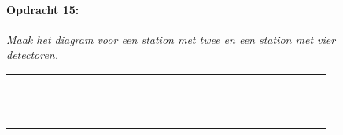 \begin{figure}[h]

\paragraph{Opdracht 15:}

\textit{Maak het diagram voor een station met twee en een station
met vier detectoren.\bigskip{}
}

\begin{tabular}{|>{\centering}p{0.1cm}|>{\centering}p{0.1cm}|>{\centering}p{0.1cm}|>{\centering}p{0.1cm}|>{\centering}p{0.1cm}|>{\centering}p{0.1cm}|>{\centering}p{0.1cm}|>{\centering}p{0.1cm}|>{\centering}p{0.1cm}|>{\centering}p{0.1cm}|>{\centering}p{0.1cm}|>{\centering}p{0.1cm}|>{\centering}p{0.1cm}|>{\centering}p{0.1cm}|>{\centering}p{0.1cm}|>{\centering}p{0.1cm}|>{\centering}p{0.1cm}|>{\centering}p{0.1cm}|>{\centering}p{0.1cm}|>{\centering}p{0.1cm}|>{\centering}p{0.1cm}|>{\centering}p{0.1cm}|>{\centering}p{0.1cm}|>{\centering}p{0.1cm}|>{\centering}p{0.1cm}|>{\centering}p{0.1cm}|>{\centering}p{0.1cm}|>{\centering}p{0.1cm}|>{\centering}p{0.1cm}|}
\hline 
 &  &  &  &  &  &  &  &  &  &  &  &  &  &  &  &  &  &  &  &  &  &  &  &  &  &  &  & \tabularnewline
\hline 
 &  &  &  &  &  &  &  &  &  &  &  &  &  &  &  &  &  &  &  &  &  &  &  &  &  &  &  & \tabularnewline
\hline 
 &  &  &  &  &  &  &  &  &  &  &  &  &  &  &  &  &  &  &  &  &  &  &  &  &  &  &  & \tabularnewline
\hline 
 &  &  &  &  &  &  &  &  &  &  &  &  &  &  &  &  &  &  &  &  &  &  &  &  &  &  &  & \tabularnewline
\hline 
 &  &  &  &  &  &  &  &  &  &  &  &  &  &  &  &  &  &  &  &  &  &  &  &  &  &  &  & \tabularnewline
\hline 
 &  &  &  &  &  &  &  &  &  &  &  &  &  &  &  &  &  &  &  &  &  &  &  &  &  &  &  & \tabularnewline
\hline 
 &  &  &  &  &  &  &  &  &  &  &  &  &  &  &  &  &  &  &  &  &  &  &  &  &  &  &  & \tabularnewline
\hline 
 &  &  &  &  &  &  &  &  &  &  &  &  &  &  &  &  &  &  &  &  &  &  &  &  &  &  &  & \tabularnewline
\hline 
 &  &  &  &  &  &  &  &  &  &  &  &  &  &  &  &  &  &  &  &  &  &  &  &  &  &  &  & \tabularnewline
\hline 
 &  &  &  &  &  &  &  &  &  &  &  &  &  &  &  &  &  &  &  &  &  &  &  &  &  &  &  & \tabularnewline
\hline 
 &  &  &  &  &  &  &  &  &  &  &  &  &  &  &  &  &  &  &  &  &  &  &  &  &  &  &  & \tabularnewline
\hline 
 &  &  &  &  &  &  &  &  &  &  &  &  &  &  &  &  &  &  &  &  &  &  &  &  &  &  &  & \tabularnewline
\hline 
 &  &  &  &  &  &  &  &  &  &  &  &  &  &  &  &  &  &  &  &  &  &  &  &  &  &  &  & \tabularnewline
\hline 
 &  &  &  &  &  &  &  &  &  &  &  &  &  &  &  &  &  &  &  &  &  &  &  &  &  &  &  & \tabularnewline

\end{tabular}
\end{figure}
